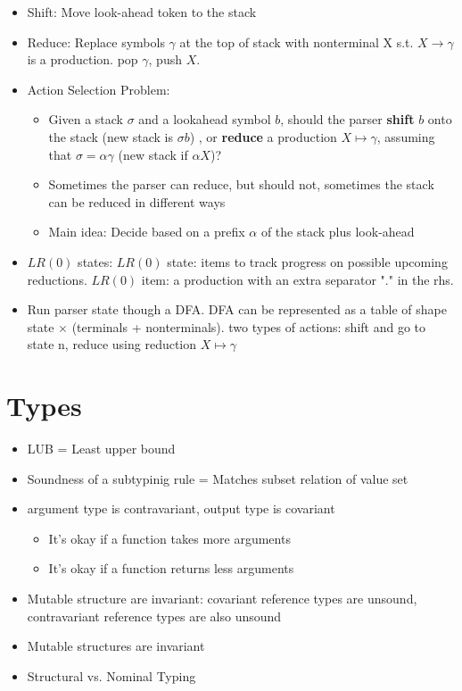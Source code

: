 \begin{itemize}
\begin{itemize}
		\item Shift: Move look-ahead token to the stack
		\item Reduce: Replace symbols $\gamma$ at the top of stack with nonterminal X s.t.  $X \rightarrow \gamma$ is a production. pop $\gamma$, push $X$. 	
		\item Action Selection Problem:
		\begin{itemize}
		\item Given a stack $\sigma$ and a lookahead symbol $b$, should the parser \textbf{shift} $b$ onto the stack (new stack is $\sigma b$) , or \textbf{reduce} a production $X \mapsto \gamma$, assuming that $\sigma = \alpha \gamma$ (new stack if $\alpha X$)?
		\item Sometimes the parser can reduce, but should not, sometimes the stack can be reduced in different ways
		\item Main idea: Decide based on a prefix $\alpha$ of the stack plus look-ahead
		\end{itemize}
		\item $LR(0)$ states: $LR(0)$ state: items to track progress on possible upcoming reductions. $LR(0)$ item: a production with an extra separator "." in the rhs.
		\item Run parser state though a DFA. DFA can be represented as a table of shape state $\times$ (terminals + nonterminals). two types of actions: shift and go to state n, reduce using reduction $X \mapsto \gamma$
	\end{itemize}
\end{itemize}


\section*{Types}
\begin{itemize}
	\item LUB = Least upper bound
	\item Soundness of a subtypinig rule = Matches subset relation of value set
	\item argument type is contravariant, output type is covariant
	\begin{itemize}
		\item It's okay if a function takes more arguments
		\item It's okay if a function returns less arguments
	\end{itemize}
	\item Mutable structure are invariant: covariant reference types are unsound, contravariant reference types are also unsound
	\item Mutable structures are invariant
	\item Structural vs. Nominal Typing
\end{itemize}
